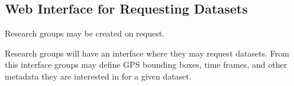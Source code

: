 \documentclass{article}
\begin{document}
\subsection{Web Interface for Requesting Datasets}

Research groups may be created on request. 

Research groups will have an interface where they may request
datasets. From this interface groups may define GPS bounding boxes,
time frames, and other metadata they are interested in for a given
dataset.



\end{document}
